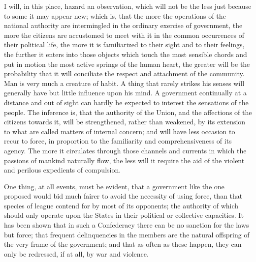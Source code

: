 I will, in this place, hazard an observation, which will not be the less just because to some it may appear new; which is, that the more the operations of the national authority are intermingled in the ordinary exercise of government, the more the citizens are accustomed to meet with it in the common occurrences of their political life, the more it is familiarized to their sight and to their feelings, the further it enters into those objects which touch the most sensible chords and put in motion the most active springs of the human heart, the greater will be the probability that it will conciliate the respect and attachment of the community. 
Man is very much a creature of habit. 
A thing that rarely strikes his senses will generally have but little influence upon his mind. 
A government continually at a distance and out of sight can hardly be expected to interest the sensations of the people. 
The inference is, that the authority of the Union, and the affections of the citizens towards it, will be strengthened, rather than weakened, by its extension to what are called matters of internal concern; and will have less occasion to recur to force, in proportion to the familiarity and comprehensiveness of its agency. 
The more it circulates through those channels and currents in which the passions of mankind naturally flow, the less will it require the aid of the violent and perilous expedients of compulsion.

One thing, at all events, must be evident, that a government like the one proposed would bid much fairer to avoid the necessity of using force, than that species of league contend for by most of its opponents; the authority of which should only operate upon the States in their political or collective capacities. 
It has been shown that in such a Confederacy there can be no sanction for the laws but force; that frequent delinquencies in the members are the natural offspring of the very frame of the government; and that as often as these happen, they can only be redressed, if at all, by war and violence.

